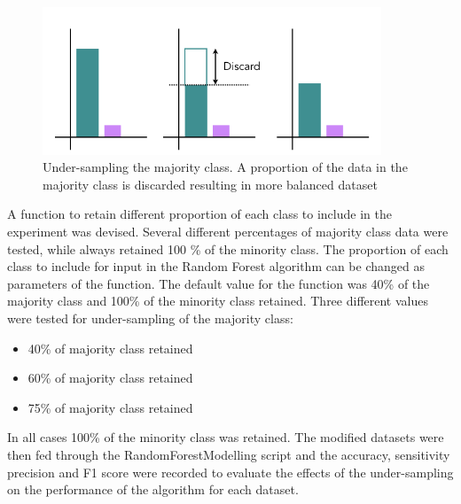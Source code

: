\begin{figure}[!htbp]
    \centering
    \includegraphics[width=0.9\textwidth]{ThesisTemplate/usingLatex/chapter4Images/Figure2001.png}
    \caption{Under-sampling the majority class. A proportion of the data in the majority class is discarded resulting in more balanced dataset}
    \label{fig:UnderSampling}
\end{figure}


A function to retain different proportion of each class to include in the experiment was devised. Several different percentages of majority class data were tested, while always retained 100 \% of the minority class.\newline
The proportion of each class to include for input in the Random Forest algorithm can be changed as parameters of the function.\newline
The default value for the function was 40\% of the majority class and 100\% of the minority class retained.\newline
Three different values were tested for under-sampling of the majority class:
\begin{itemize}
    \item 40\% of majority class retained
    \item 60\% of majority class retained
    \item 75\% of majority class retained
\end{itemize}

In all cases 100\% of the minority class was retained.\newline
The modified datasets were then fed through the RandomForestModelling script and the accuracy, sensitivity precision and F1 score were recorded to evaluate the effects of the under-sampling on the performance of the algorithm for each dataset.\newline



